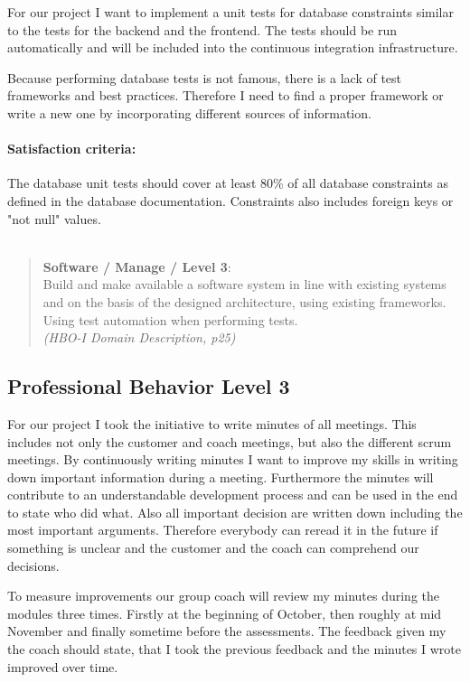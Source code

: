 For our project I want to implement a unit tests for database constraints similar to the tests for the backend and the frontend. The tests should be run automatically and will be included into the continuous integration infrastructure.

Because performing database tests is not famous, there is a lack of test frameworks and best practices. Therefore I need to find a proper framework or write a new one by incorporating different sources of information.

\paragraph{Satisfaction criteria:} The database unit tests should cover at least 80\% of all database constraints as defined in the database documentation. Constraints also includes foreign keys or "not null" values.
~\\~\\
\begin{minipage}{\textwidth}
\begin{quote}
	\textbf{Software / Manage / Level 3}: \\
	Build and make available a software system in line with existing systems and on the basis of the designed architecture, using existing frameworks.
	Using test automation when performing tests.
	\\ \textit{(HBO-I Domain Description, p25)}
\end{quote}
\end{minipage}



\subsection{Professional Behavior Level 3}

For our project I took the initiative to write minutes of all meetings. This includes not only the customer and coach meetings, but also the different scrum meetings.
By continuously writing minutes I want to improve my skills in writing down important information during a meeting. Furthermore the minutes will contribute to an understandable development process and can be used in the end to state who did what.
Also all important decision are written down including the most important arguments. Therefore everybody can reread it in the future if something is unclear and the customer and the coach can comprehend our decisions.

To measure improvements our group coach will review my minutes during the modules three times. Firstly at the beginning of October, then roughly at mid November and finally sometime before the assessments. The feedback given my the coach should state, that I took the previous feedback and the minutes I wrote improved over time.
